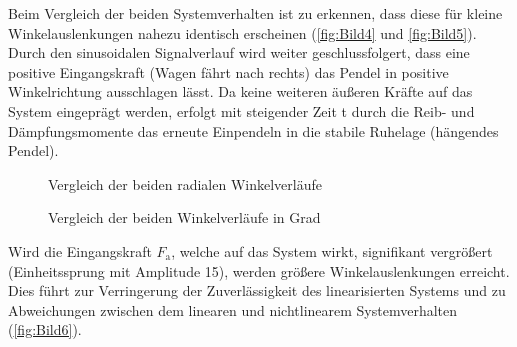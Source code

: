 Beim Vergleich der beiden Systemverhalten ist zu erkennen, dass diese für kleine Winkelauslenkungen nahezu identisch erscheinen (\autoref{fig:Bild4} und \autoref{fig:Bild5}). Durch den sinusoidalen Signalverlauf wird weiter geschlussfolgert, dass eine positive Eingangskraft (Wagen fährt nach rechts) das Pendel in positive Winkelrichtung ausschlagen lässt. Da keine weiteren äußeren Kräfte auf das System eingeprägt werden, erfolgt mit steigender Zeit t durch die Reib- und Dämpfungsmomente das erneute Einpendeln in die stabile Ruhelage (hängendes Pendel).

\begin{figure}[H]
   \centering
   \caption[Vergleich der beiden radialen Winkelverläufe]{Vergleich der beiden radialen Winkelverläufe}
   \label{fig:Bild4}
\end{figure}

\begin{figure}[H]
    \centering
    \caption[Vergleich der beiden Winkelverläufe in Grad]{Vergleich der beiden Winkelverläufe in Grad}
    \label{fig:Bild5}
\end{figure}

Wird die Eingangskraft $F_{\mathrm{a}}$, welche auf das System wirkt, signifikant vergrößert (Einheitssprung mit Amplitude 15), werden größere Winkelauslenkungen erreicht. Dies führt zur Verringerung der Zuverlässigkeit des linearisierten Systems und zu Abweichungen zwischen dem linearen und nichtlinearem Systemverhalten (\autoref{fig:Bild6}).

